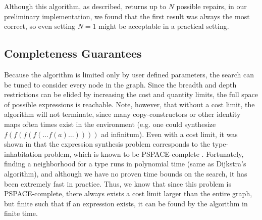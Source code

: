 Although this algorithm, as described, returns up to $N$ possible repairs, in our preliminary implementation, we found that the first result was always the most correct, so even setting $N=1$ might be acceptable in a practical setting.

\subsection{Completeness Guarantees}

Because the algorithm is limited only by user defined parameters, the search can be tuned to consider every node in the graph. Since the breadth and depth restrictions can be elided by increasing the cost and quantity limits, the full space of possible expressions is reachable. Note, however, that without a cost limit, the algorithm will not terminate, since many copy-constructors or other identity maps often times exist in the environment (e.g. one could synthesize $f(f(f(f(\ldots f(a)\ldots ))))$ ad infinitum). Even with a cost limit, it was shown in \cite{GveroETAL13CompleteCompletionTypesWeights} that the expression synthesis problem corresponds to the type-inhabitation problem, which is known to be PSPACE-complete \cite{Urzyczyn97}. Fortunately, finding a neighborhood for a type runs in polynomial time (same as Dijkstra's algorithm), and although we have no proven time bounds on the search, it has been extremely fast in practice. Thus, we know that since this problem is PSPACE-complete, there always exists a cost limit larger than the entire graph, but finite such that if an expression exists, it can be found by the algorithm in finite time.

